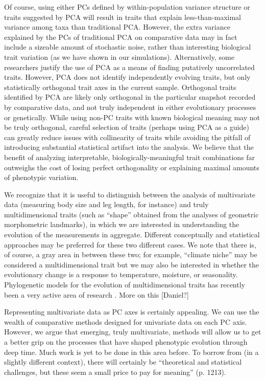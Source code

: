 \documentclass[a4paper,12pt]{article}
\begin{document}
Of course, using either PCs defined by within-population variance structure or traits suggested by PCA will result in traits that explain less-than-maximal variance among taxa than traditional PCA. However, the extra variance explained by the PCs of traditional PCA on comparative data may in fact include a sizeable amount of stochastic noise, rather than interesting biological trait variation (as we have shown in our simulations). Alternatively, some researchers justify the use of PCA as a means of finding putatively uncorrelated traits. However, PCA does not identify independently evolving traits, but only statistically orthogonal trait axes in the current sample. Orthogonal traits identified by PCA are likely only orthogonal in the particular snapshot recorded by comparative data, and not truly independent in either evolutionary processes or genetically. While using non-PC traits with known biological meaning may not be truly orthogonal, careful selection of traits (perhaps using PCA as a guide) can greatly reduce issues with collinearity of traits while avoiding the pitfall of introducing substantial statistical artifact into the analysis. We believe that the benefit of analyzing interpretable, biologically-meaningful trait combinations far outweighs the cost of losing perfect orthogonality or explaining maximal amounts of phenotypic variation.  

We recognize that it is useful to distinguish between the analysis of multivariate data (measuring body size and leg length, for instance) and truly multidimensional traits (such as ``shape'' obtained from the analyses of geometric morphometric landmarks), in which we are interested in understanding the evolution of the measurements in aggregate. Different conceptually and statistical approaches may be preferred for these two different cases. We note that there is, of course, a gray area in between these two; for example, ``climate niche'' may be considered a multidimensional trait but we may also be interested in whether the evolutionary change is a response to temperature, moisture, or seasonality. Phylogenetic models for the evolution of multidimensional traits has recently been a very active area of research \citep{Bookstein2012, Klingenberg2013, Monteiro2013, Adams2014, Adams2014b}. More on this [Daniel?]

Representing multivariate data as PC axes is certainly appealing. We can use the wealth of comparative methods designed for univariate data on each PC axis. However, we argue that emerging, truly multivariate, methods will allow us to get a better grip on the processes that have shaped phenotypic evolution through deep time. Much work is yet to be done in this area before. To borrow from \citet{HansenHoule2008} (in a slightly different context), there will certainly be ``theoretical and statistical challenges, but these seem a small price to pay for meaning'' (p. 1213).
\end{document}
